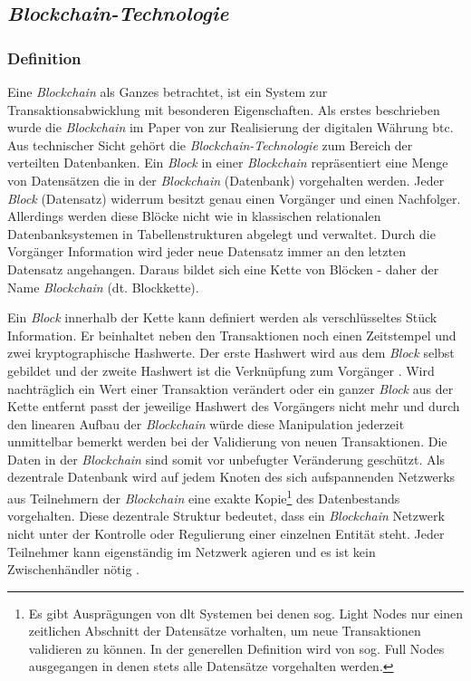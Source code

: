 \subsection{\textit{Blockchain-Technologie}}

\subsubsection{Definition} \label{blockchain-definition}
Eine \textit{Blockchain} als Ganzes betrachtet, ist ein System zur Transaktionsabwicklung mit besonderen Eigenschaften. Als erstes beschrieben wurde die \textit{Blockchain} im Paper von \cite{Nakamoto2009} zur Realisierung der digitalen Währung \ac{btc}. Aus technischer Sicht gehört die \textit{Blockchain-Technologie} zum Bereich der verteilten Datenbanken. Ein \textit{Block} in einer \textit{Blockchain} repräsentiert eine Menge von Datensätzen die in der \textit{Blockchain} (Datenbank) vorgehalten werden. Jeder \textit{Block} (Datensatz) widerrum besitzt genau einen Vorgänger und einen Nachfolger. Allerdings werden diese Blöcke nicht wie in klassischen relationalen Datenbanksystemen in Tabellenstrukturen abgelegt und verwaltet. Durch die Vorgänger Information wird jeder neue Datensatz immer an den letzten Datensatz angehangen. Daraus bildet sich eine Kette von Blöcken - daher der Name \textit{Blockchain} (dt. Blockkette).

Ein \textit{Block} innerhalb der Kette kann definiert werden als verschlüsseltes Stück Information. Er beinhaltet neben den Transaktionen noch einen Zeitstempel und zwei kryptographische Hashwerte. Der erste Hashwert wird aus dem \textit{Block} selbst gebildet und der zweite Hashwert ist die Verknüpfung zum Vorgänger \citep{Tschorsch2016}. Wird nachträglich ein Wert einer Transaktion verändert oder ein ganzer \textit{Block} aus der Kette entfernt passt der jeweilige Hashwert des Vorgängers nicht mehr und durch den linearen Aufbau der \textit{Blockchain} würde diese Manipulation jederzeit unmittelbar bemerkt werden bei der Validierung von neuen Transaktionen. Die Daten in der \textit{Blockchain} sind somit vor unbefugter Veränderung geschützt. Als dezentrale Datenbank wird auf jedem Knoten des sich aufspannenden Netzwerks aus Teilnehmern der \textit{Blockchain} eine exakte Kopie\footnote{Es gibt Ausprägungen von \ac{dlt} Systemen bei denen sog. Light Nodes nur einen zeitlichen Abschnitt der Datensätze vorhalten, um neue Transaktionen validieren zu können. In der generellen Definition wird von sog. Full Nodes ausgegangen in denen stets alle Datensätze vorgehalten werden.} des Datenbestands vorgehalten. Diese dezentrale Struktur bedeutet, dass ein \textit{Blockchain} Netzwerk nicht unter der Kontrolle oder Regulierung einer einzelnen Entität steht. Jeder Teilnehmer kann eigenständig im Netzwerk agieren und es ist kein Zwischenhändler nötig \citep{Drescher2017}.

